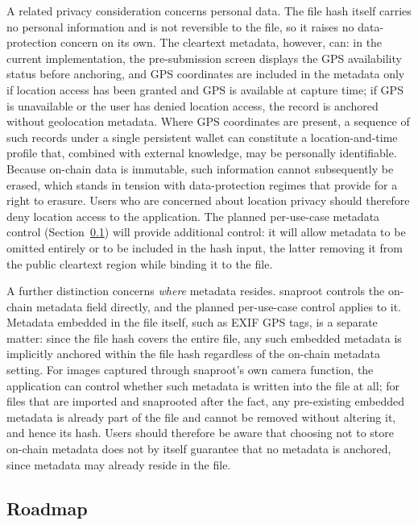 \documentclass[11pt,a4paper]{article}
\begin{document}
A related privacy consideration concerns personal data. The file hash
itself carries no personal information and is not reversible to the
file, so it raises no data-protection concern on its own. The cleartext
metadata, however, can: in the current implementation, the
pre-submission screen displays the GPS availability status before
anchoring, and GPS coordinates are included in the metadata only if
location access has been granted and GPS is available at capture time;
if GPS is unavailable or the user has denied location access, the
record is anchored without geolocation metadata. Where GPS coordinates
are present, a sequence of such records under a single persistent wallet
can constitute a location-and-time profile that, combined with external
knowledge, may be personally identifiable. Because on-chain data is
immutable, such information cannot subsequently be erased, which stands
in tension with data-protection regimes that provide for a right to
erasure. Users who are concerned about location privacy should therefore
deny location access to the application. The planned per-use-case
metadata control (Section~\ref{sec:limitations:roadmap}) will provide
additional control: it will allow metadata to be omitted entirely or
to be included in the hash input, the latter removing it from the public
cleartext region while binding it to the file.

A further distinction concerns \emph{where} metadata resides. snaproot
controls the on-chain metadata field directly, and the planned
per-use-case control applies to it. Metadata embedded in the file
itself, such as EXIF GPS tags, is a separate matter: since the file
hash covers the entire file, any such embedded metadata is implicitly
anchored within the file hash regardless of the on-chain metadata
setting. For images captured through snaproot's own camera function,
the application can control whether such metadata is written into the
file at all; for files that are imported and snaprooted after the fact,
any pre-existing embedded metadata is already part of the file and
cannot be removed without altering it, and hence its hash. Users should
therefore be aware that choosing not to store on-chain metadata does
not by itself guarantee that no metadata is anchored, since metadata
may already reside in the file.

\subsection{Roadmap}
\label{sec:limitations:roadmap}
\end{document}
